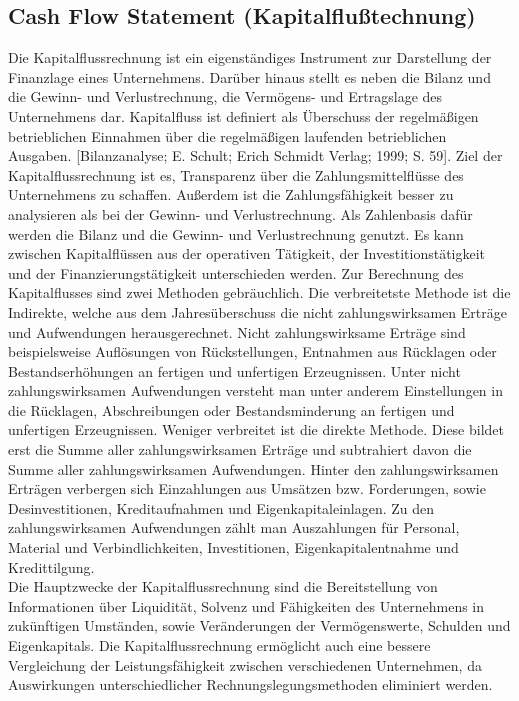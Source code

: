 \subsection{Cash Flow Statement (Kapitalflußtechnung)}
Die Kapitalflussrechnung ist ein eigenständiges Instrument zur Darstellung der Finanzlage eines Unternehmens. Darüber hinaus stellt es neben die Bilanz und die Gewinn- und Verlustrechnung, die Vermögens- und Ertragslage des Unternehmens dar. \cite{coenenberg2001kapitalflussrechnung} Kapitalfluss ist definiert als  Überschuss der regelmäßigen betrieblichen Einnahmen über die  regelmäßigen laufenden betrieblichen Ausgaben. [Bilanzanalyse; E. Schult; Erich Schmidt Verlag; 1999; S. 59]. Ziel der Kapitalflussrechnung ist es, Transparenz über die Zahlungsmittelflüsse des Unternehmens zu schaffen. Außerdem ist die Zahlungsfähigkeit besser zu analysieren als bei der Gewinn- und Verlustrechnung. Als Zahlenbasis dafür werden die Bilanz und die Gewinn- und Verlustrechnung genutzt. Es kann zwischen Kapitalflüssen aus der operativen Tätigkeit,  der Investitionstätigkeit und der Finanzierungstätigkeit  unterschieden werden. Zur Berechnung des Kapitalflusses sind zwei Methoden gebräuchlich. Die verbreitetste Methode ist die Indirekte, welche aus dem Jahresüberschuss die nicht zahlungswirksamen Erträge und Aufwendungen herausgerechnet. Nicht zahlungswirksame Erträge sind beispielsweise Auflösungen von Rückstellungen, Entnahmen aus Rücklagen oder Bestandserhöhungen an fertigen und unfertigen Erzeugnissen. Unter nicht zahlungswirksamen Aufwendungen versteht man unter anderem Einstellungen in die Rücklagen, Abschreibungen oder Bestandsminderung an fertigen und unfertigen Erzeugnissen. Weniger verbreitet ist die direkte Methode. Diese bildet erst die Summe aller zahlungswirksamen Erträge und subtrahiert davon die Summe aller zahlungswirksamen Aufwendungen. Hinter den zahlungswirksamen Erträgen verbergen sich Einzahlungen aus Umsätzen bzw. Forderungen, sowie Desinvestitionen, Kreditaufnahmen und Eigenkapitaleinlagen. Zu den zahlungswirksamen Aufwendungen zählt man Auszahlungen für Personal, Material und Verbindlichkeiten, Investitionen, Eigenkapitalentnahme und Kredittilgung.
\\
Die Hauptzwecke der Kapitalflussrechnung sind die Bereitstellung von Informationen über Liquidität, Solvenz und Fähigkeiten des Unternehmens in zukünftigen Umständen, sowie Veränderungen der Vermögenswerte, Schulden und Eigenkapitals. Die Kapitalflussrechnung ermöglicht auch eine bessere Vergleichung der Leistungsfähigkeit zwischen verschiedenen Unternehmen,  da Auswirkungen unterschiedlicher Rechnungslegungsmethoden eliminiert werden. \cite{coenenberg2001kapitalflussrechnung}